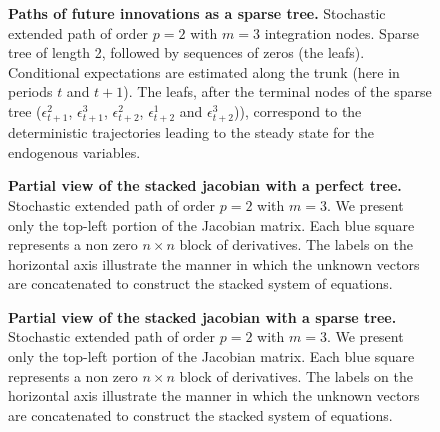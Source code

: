 \documentclass[a4paper,11pt]{amsart}
\begin{document}
\begin{figure}[H]
   \centering
   {\tiny
      }
   \bigskip\bigskip
   \caption{\textbf{Paths of  future innovations as a sparse tree.} Stochastic extended path of order $p=2$ with $m=3$ integration nodes. Sparse tree of length 2, followed by sequences of zeros (the leafs). Conditional expectations are estimated along the trunk (here in periods $t$ and $t+1$). The leafs, after the terminal nodes of the sparse tree ($\epsilon_{t+1}^2$, $\epsilon_{t+1}^3$, $\epsilon_{t+2}^2$, $\epsilon_{t+2}^1$ and $\epsilon_{t+2}^3$)), correspond to the deterministic trajectories leading to the steady state for the endogenous variables.}
   \label{fig:sep:sparse-tree}
\end{figure}


\begin{figure}[H]
   \centering
   \hspace*{-0.8cm}\scalebox{.85}{}
   \caption{\textbf{Partial view of the stacked jacobian with a perfect tree.} Stochastic extended path of order $p=2$ with $m=3$. We present only the top-left portion of the Jacobian matrix. Each blue square represents a non zero $n\times n$ block of derivatives. The labels on the horizontal axis illustrate the manner in which the unknown vectors are concatenated to construct the stacked system of equations.}
   \label{fig:jacobian:perfect-tree}
\end{figure}


\begin{figure}[H]
   \centering
   \hspace*{-0.4cm}\scalebox{.85}{}
   \caption{\textbf{Partial view of the stacked jacobian with a sparse tree.} Stochastic extended path of order $p=2$ with $m=3$. We present only the top-left portion of the Jacobian matrix. Each blue square represents a non zero $n\times n$ block of derivatives. The labels on the horizontal axis illustrate the manner in which the unknown vectors are concatenated to construct the stacked system of equations.}
   \label{fig:jacobian:sparse-tree}
\end{figure}
\end{document}

